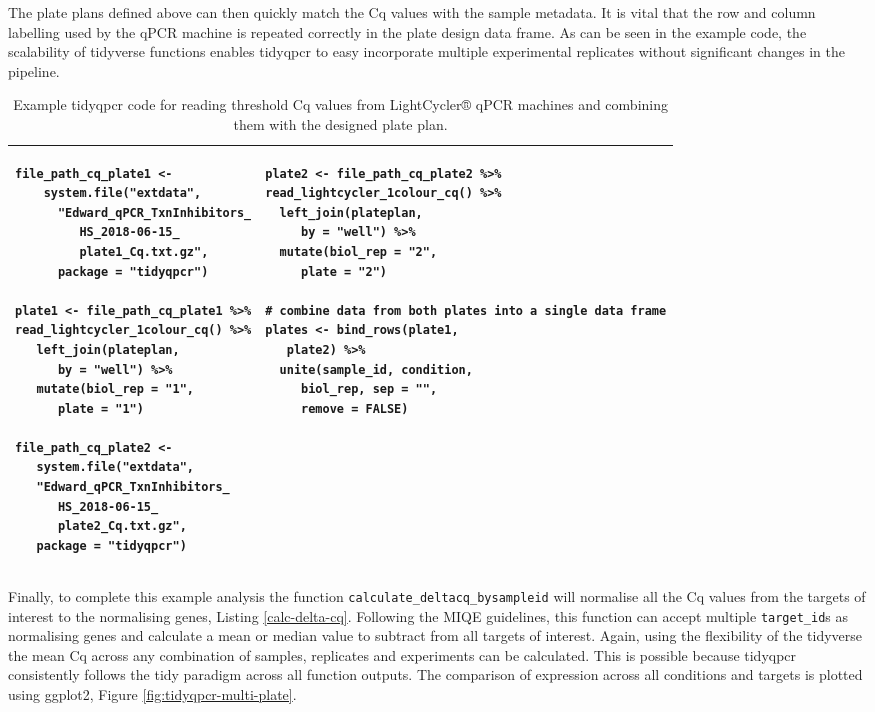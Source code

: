 \documentclass[../main.tex]{subfiles}
\begin{document}
The plate plans defined above can then quickly match the Cq values with the sample metadata. It is vital that the row and column labelling used by the qPCR machine is repeated correctly in the plate design data frame. 
As can be seen in the example code, the scalability of tidyverse functions enables tidyqpcr to easy incorporate multiple experimental replicates without significant changes in the pipeline.
\begin{table}
\centering
\begin{tabular}{|p{5.6cm}  p{5.6cm}|}
\hline
 \begin{lstlisting}[firstnumber=40, style=mystyle]
 file_path_cq_plate1 <- 
    system.file("extdata",
      "Edward_qPCR_TxnInhibitors_
         HS_2018-06-15_
         plate1_Cq.txt.gz",
      package = "tidyqpcr")

plate1 <- file_path_cq_plate1 %>%
read_lightcycler_1colour_cq() %>%
   left_join(plateplan,
      by = "well") %>%
   mutate(biol_rep = "1",
      plate = "1")

file_path_cq_plate2 <-
   system.file("extdata",
   "Edward_qPCR_TxnInhibitors_
      HS_2018-06-15_
      plate2_Cq.txt.gz",
   package = "tidyqpcr")
\end{lstlisting} &
\begin{lstlisting}[firstnumber=60, style=mystyle]
plate2 <- file_path_cq_plate2 %>%
read_lightcycler_1colour_cq() %>%
  left_join(plateplan,
     by = "well") %>%
  mutate(biol_rep = "2",
     plate = "2")

# combine data from both plates into a single data frame
plates <- bind_rows(plate1,
   plate2) %>%
  unite(sample_id, condition,
     biol_rep, sep = "",
     remove = FALSE)
\end{lstlisting} \\
\hline
\end{tabular}
\caption{Example tidyqpcr code for reading threshold Cq values from LightCycler® qPCR machines and combining them with the designed plate plan.}
\label{read-raw-data}
\end{table}

Finally, to complete this example analysis the function \lstinline{calculate_deltacq_}\lstinline{bysampleid} will normalise all the Cq values from the targets of interest to the normalising genes, Listing \ref{calc-delta-cq}. 
Following the MIQE guidelines,  this function can accept multiple \lstinline{target_id}s as normalising genes and calculate a mean or median value to subtract from all targets of interest. 
Again, using the flexibility of the tidyverse the mean Cq across any combination of samples, replicates and experiments can be calculated. 
This is possible because tidyqpcr consistently follows the tidy paradigm across all function outputs. 
The comparison of expression across all conditions and targets is plotted using ggplot2, Figure \ref{fig:tidyqpcr-multi-plate}.
\end{document}
